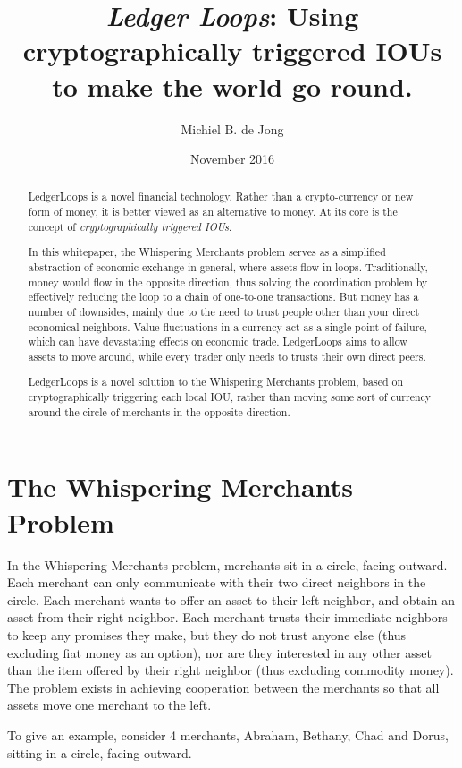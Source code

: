 \documentclass[11pt,twoside,a4paper]{article}
\begin{document}
\title{{\em Ledger Loops}: Using cryptographically triggered IOUs to make the world go round.}
\author{Michiel B. de Jong}
\date{November 2016}
\maketitle
\begin{abstract}
LedgerLoops is a novel financial technology. Rather than a crypto-currency or new form of money, it is better viewed as an alternative to money. At its core is the concept of {\em cryptographically triggered IOUs}.

In this whitepaper, the Whispering Merchants problem serves as a simplified abstraction of economic exchange in general, where assets flow in loops. Traditionally, money would flow in the opposite direction, thus solving the coordination problem by effectively reducing the loop to a chain of one-to-one transactions. But money has a number of downsides, mainly due to the need to trust people other than your direct economical neighbors. Value fluctuations in a currency act as a single point of failure, which can have devastating effects on economic trade. LedgerLoops aims to allow assets to move around, while every trader only needs to trusts their own direct peers.

LedgerLoops is a novel solution to the Whispering Merchants problem, based on cryptographically triggering each local IOU, rather than moving some sort of currency around the circle of merchants in the opposite direction.
\end{abstract}

\section{The Whispering Merchants Problem}
In the Whispering Merchants problem, merchants sit in a circle, facing outward. Each merchant can only communicate with their two direct neighbors in the circle. Each merchant wants to offer an asset to their left neighbor, and obtain an asset from their right neighbor. Each merchant trusts their immediate neighbors to keep any promises they make, but they do not trust anyone else (thus excluding fiat money as an option), nor are they interested in any other asset than the item offered by their right neighbor (thus excluding commodity money). The problem exists in achieving cooperation between the merchants so that all assets move one merchant to the left.

To give an example, consider 4 merchants, Abraham, Bethany, Chad and Dorus, sitting in a circle, facing outward.
\end{document}
